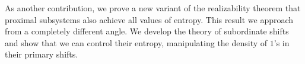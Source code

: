 As another contribution, we prove a new variant of the realizability theorem that proximal subsystems also achieve all values of entropy.
%
This result we approach from a completely different angle. We develop the theory of subordinate shifts and show that we can control their entropy, manipulating the density of $1$'s in their primary shifts.

